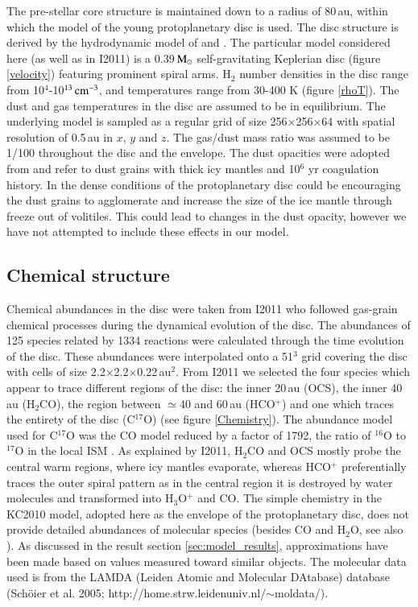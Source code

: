 \documentclass[useAMS,usenatbib]{mn2e}
\begin{document}
The pre-stellar core structure is maintained down to a radius of 80\,au, within which the model of the young protoplanetary disc is used. The disc structure is derived by the hydrodynamic model of \citet{Boley2007} and  \citet{Boley2009}. The particular model considered here (as well as in I2011) is a 0.39$\,\rm{M}_\odot$ self-gravitating Keplerian disc (figure \ref{velocity}) featuring prominent spiral arms. H$_2$ number densities in the disc range from 10$^{4}$-10$^{13}\,\rm{cm}^{-3}$, and temperatures range from 30-400 K (figure \ref{rhoT}). The dust and gas temperatures in the disc are assumed to be in equilibrium. The underlying model is sampled as a regular grid of size 256$\times$256$\times$64 with spatial resolution of 0.5$\,$au in $x$, $y$ and $z$. The gas/dust mass ratio was assumed to be 1/100 throughout the disc and the envelope. The dust opacities were adopted from \citet{Ossenkopf1994} and refer to dust grains with thick icy mantles and 10$^6$ yr coagulation history. In the dense conditions of the protoplanetary disc could be encouraging the dust grains to agglomerate and increase the size of the ice mantle through freeze out of volitiles. This could lead to changes in the dust opacity, however we have not attempted to include these effects in our model.\smallskip

\subsection{Chemical structure} \label{subsec:chemical_structure}
Chemical abundances in the disc were taken from I2011 who followed gas-grain chemical processes during the dynamical evolution of the disc. The abundances of 125 species related by 1334 reactions were calculated through the time evolution of the disc. These abundances were interpolated onto a 51$^3$ grid covering the disc with cells of size 2.2$\times$2.2$\times$0.22$\,$au$^2$.  From I2011 we selected the four species which appear to trace different regions of the disc: the inner 20\,au (OCS), the inner 40\,au (H$_2$CO),  the region between $\simeq$40 and 60\,au (HCO$^+$) and one which traces the entirety of the disc (C$^{17}$O) (see figure \ref{Chemistry}). The abundance model used for C$^{17}$O was the CO model reduced by a factor of 1792, the ratio of $^{16}$O to $^{17}$O in the local ISM \citep{Wilson1994}. As explained by I2011,  H$_2$CO and OCS mostly probe the central warm regions, where icy mantles evaporate, whereas HCO$^+$ preferentially traces the outer spiral pattern as in the central region it is destroyed by water molecules and transformed into H$_3$O$^+$ and CO. The simple chemistry in the KC2010 model, adopted here as the envelope of the protoplanetary disc, does not provide detailed abundances of molecular species (besides CO and H$_2$O, see also \cite{Caselli2012}). As discussed in the result section \ref{sec:model_results}, approximations have been made based on values measured toward similar objects. The molecular data used is from the LAMDA (Leiden Atomic and Molecular DAtabase) database (Sch\"oier et al. 2005; http://home.strw.leidenuniv.nl/$\sim$moldata/).
\end{document}
